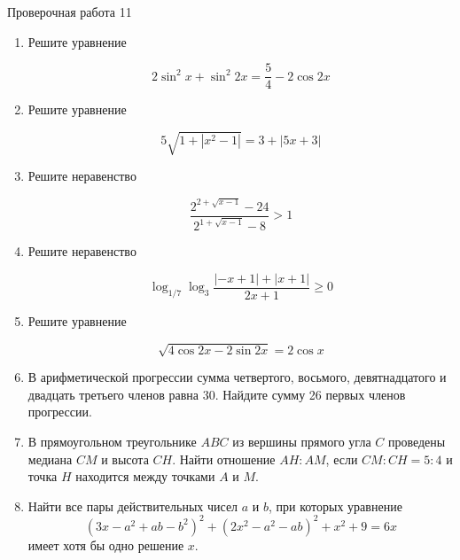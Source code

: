 \documentclass[11pt,a5paper]{report}
\begin{document}
\newpage

\begin{center}
Проверочная работа 11


\end{center}

\begin{enumerate}

\item Решите уравнение

$$2\sin^2 x+\sin^2 2x = \frac{5}{4}-2\cos 2x$$

\item Решите уравнение

$$5\sqrt{1+|x^2-1|} = 3 + |5x+3|$$

\item Решите неравенство

$$\frac{2^{2+\sqrt{x-1}}-24}{2^{1+\sqrt{x-1}}-8} > 1$$

\item Решите неравенство

$$\log_{1/7}\log_{3}\frac{|-x+1|+|x+1|}{2x+1} \geqslant 0$$

\item Решите уравнение

$$\sqrt{4\cos 2x - 2\sin 2x} = 2\cos x$$

\item В арифметической прогрессии сумма четвертого, восьмого, девятнадцатого и двадцать третьего членов равна 30. Найдите сумму 26 первых членов прогрессии.

\item В прямоугольном треугольнике $ABC$ из вершины прямого угла $C$ проведены медиана $CM$ и высота $CH$. Найти отношение $AH:AM$, если $CM:CH=5:4$ и точка $H$ находится между точками $A$ и $M$.

\item Найти все пары действительных чисел $a$ и $b$, при которых уравнение
$$(3x-a^2+ab-b^2)^2+(2x^2-a^2-ab)^2+x^2+9=6x$$
имеет хотя бы одно решение $x$.

\end{enumerate}

\newpage
\end{document}
